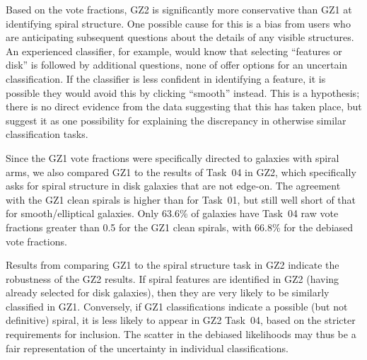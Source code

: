 \documentclass[useAMS,usenatbib]{mn2e}
\begin{document}
Based on the vote fractions, GZ2 is significantly more conservative than GZ1 at identifying spiral structure. One possible cause for this is a bias from users who are anticipating subsequent questions about the details of any visible structures. An experienced classifier, for example, would know that selecting ``features or disk'' is followed by additional questions, none of offer options for an uncertain classification. If the classifier is less confident in identifying a feature, it is possible they would avoid this by clicking ``smooth'' instead. This is a hypothesis; there is no direct evidence from the data suggesting that this has taken place, but suggest it as one possibility for explaining the discrepancy in otherwise similar classification tasks. 

Since the GZ1 vote fractions were specifically directed to galaxies with spiral arms, we also compared GZ1 to the results of Task~04 in GZ2, which specifically asks for spiral structure in disk galaxies that are not edge-on. The agreement with the GZ1 clean spirals is higher than for Task~01, but still well short of that for smooth/elliptical galaxies. Only 63.6\% of galaxies have Task~04 raw vote fractions greater than 0.5 for the GZ1 clean spirals, with 66.8\% for the debiased vote fractions. 

Results from comparing GZ1 to the spiral structure task in GZ2 indicate the robustness of the GZ2 results. If spiral features are identified in GZ2 (having already selected for disk galaxies), then they are very likely to be similarly classified in GZ1. Conversely, if GZ1 classifications indicate a possible (but not definitive) spiral, it is less likely to appear in GZ2 Task~04, based on the stricter requirements for inclusion. The scatter in the debiased likelihoods may thus be a fair representation of the uncertainty in individual classifications.
\end{document}
